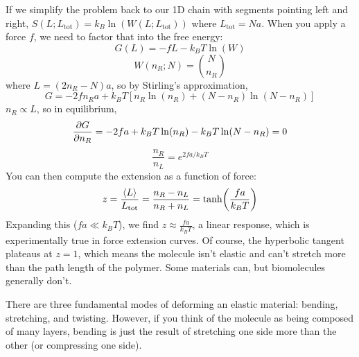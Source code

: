 \documentclass[a4paper,twoside,master.tex]{subfiles}
\begin{document}
If we simplify the problem back to our 1D chain with segments pointing left and right, $ S(L;L_{\text{tot}})= k_B \ln(W(L;L_{\text{tot}})) $ where $ L_{\text{tot}} = Na $. When you apply a force $ f $, we need to factor that into the free energy:
\begin{equation}
    G(L) = - fL - k_B T \ln(W)
\end{equation}
\begin{equation}
    W(n_R;N) = \binom{N}{n_R}
\end{equation}
where $ L = (2 n_R - N)a $, so by Stirling's approximation,
\begin{equation}
    G = - 2 f n_R a + k_B T \left[ n_R \ln(n_R) + (N - n_R) \ln(N - n_R) \right]
\end{equation}
$ n_R \propto L $, so in equilibrium,
\begin{equation}
    \pdv{G}{n_R} = - 2 f a + k_B T \ln(n_R) - k_B T \ln(N - n_R) = 0
\end{equation}
\begin{equation}
    \frac{n_R}{n_L} = e^{2fa/k_B T}
\end{equation}
You can then compute the extension as a function of force:
\begin{equation}
    z = \frac{\ev{L}}{L_{\text{tot}}} = \frac{n_R - n_L}{n_R + n_L} = \tanh(\frac{fa}{k_B T})
\end{equation}
Expanding this ($ f a \ll k_B T $), we find $ z \approx \frac{f a}{k_B T} $, a linear response, which is experimentally true in force extension curves. Of course, the hyperbolic tangent plateaus at $ z = 1 $, which means the molecule isn't elastic and can't stretch more than the path length of the polymer. Some materials can, but biomolecules generally don't.


There are three fundamental modes of deforming an elastic material: bending, stretching, and twisting. However, if you think of the molecule as being composed of many layers, bending is just the result of stretching one side more than the other (or compressing one side).
\end{document}
